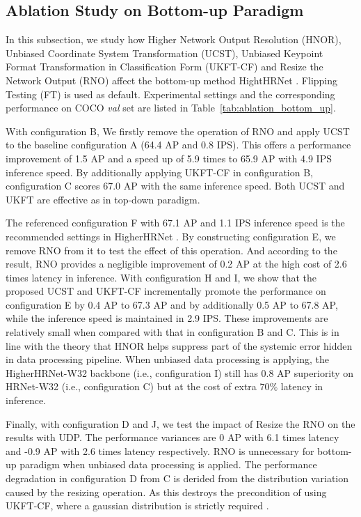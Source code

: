 \documentclass[10pt,journal,compsoc]{IEEEtran}
\begin{document}
\subsection{Ablation Study on Bottom-up Paradigm}
In this subsection, we study how Higher Network Output Resolution (HNOR), Unbiased Coordinate System Transformation (UCST), Unbiased Keypoint Format Transformation in Classification Form (UKFT-CF) and Resize the Network Output (RNO) affect the bottom-up method HightHRNet \cite{Higher}. Flipping Testing (FT) is used as default. Experimental settings and the corresponding performance on COCO \textit{val} set are listed in Table~\ref{tab:ablation_bottom_up}.

With configuration B, We firstly remove the operation of RNO and apply UCST to the baseline configuration A (64.4 AP and 0.8 IPS). This offers a performance improvement of 1.5 AP and a speed up of 5.9 times to 65.9 AP with 4.9 IPS inference speed. By additionally applying UKFT-CF in configuration B, configuration C scores 67.0 AP with the same inference speed. Both UCST and UKFT are effective as in top-down paradigm.

The referenced configuration F with 67.1 AP and 1.1 IPS inference speed is the recommended settings in HigherHRNet \cite{Higher}. By constructing configuration E, we remove RNO from it to test the effect of this operation. And according to the result, RNO provides a negligible improvement of 0.2 AP at the high cost of 2.6 times latency in inference. With configuration H and I, we show that the proposed UCST and UKFT-CF incrementally promote the performance on configuration E by 0.4 AP to 67.3 AP and by additionally 0.5 AP to 67.8 AP, while the inference speed is maintained in 2.9 IPS. These improvements are relatively small when compared with that in configuration B and C. This is in line with the theory that HNOR helps suppress part of the systemic error hidden in data processing pipeline. When unbiased data processing is applying, the HigherHRNet-W32 backbone (i.e., configuration I) still has 0.8 AP superiority on HRNet-W32 (i.e., configuration C) but at the cost of extra $70\%$ latency in inference.

Finally, with configuration D and J, we test the impact of Resize the RNO on the results with UDP. The performance variances are 0 AP with 6.1 times latency and -0.9 AP with 2.6 times latency respectively. RNO is unnecessary for bottom-up paradigm when unbiased data processing is applied. The performance degradation in configuration D from C is derided from the distribution variation caused by the resizing operation. As this destroys the precondition of using UKFT-CF, where a gaussian distribution is strictly required \cite{DARK}.
\end{document}
